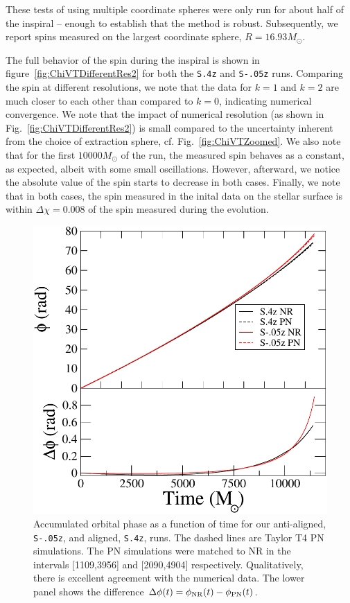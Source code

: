 {These tests of using multiple coordinate spheres were only run for
about half of the inspiral -- enough to establish that the method is
robust.  Subsequently, we report spins measured on the largest
coordinate sphere, $R=16.93M_\odot$.

The full behavior of the spin during the inspiral is shown in
figure~\ref{fig:ChiVTDifferentRes2} for both the {\tt S.4z} and {\tt S-.05z} runs.
Comparing the spin at different resolutions, we note that the data for
$k\!=\!1$ and $k\!=\!2$ are much closer to each other than compared to
$k\!=\!0$, indicating numerical convergence.  We note that the impact
of numerical resolution (as shown in
Fig.~\ref{fig:ChiVTDifferentRes2}) is small compared to the
uncertainty inherent from the choice of extraction sphere,
cf. Fig.~\ref{fig:ChiVTZoomed}.  We also note that for the first
$10000M_{\odot}$ of the run, the measured spin behaves as a constant,
as expected, albeit with some small oscillations. However,
afterward, we notice the
absolute value of the spin starts to decrease in both cases.
Finally, we note that in both cases, the spin measured in the inital
data on the stellar surface is within $\Delta \chi = 0.008$ of the spin
measured during the evolution.  

\begin{figure}
\includegraphics[width=0.95\columnwidth]{chap2/PhaseComparison}
\caption[Accumulated orbital phase as a function of time for our aligned and anti-aligned runs.]{ {\label{fig:Hangup}} Accumulated orbital phase as a function
  of time for our anti-aligned, {\tt S-.05z}, and aligned, {\tt S.4z}, runs. The
  dashed lines are Taylor T4 PN simulations. The PN simulations were
  matched to NR in the intervals [1109,3956] and [2090,4904]
  respectively. Qualitatively, there
  is excellent agreement with the numerical data. The lower panel
  shows the difference
  $\Delta\phi(t)=\phi_{\rm NR}(t)-\phi_{\rm PN}(t)$.}
\end{figure}

}
